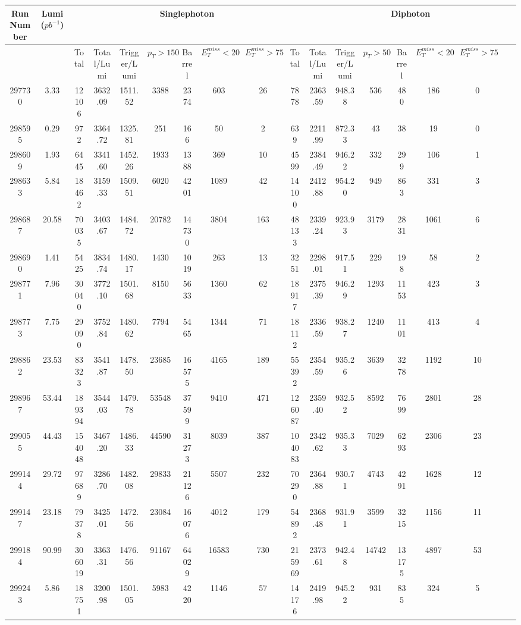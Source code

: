 \documentclass[10pt]{extarticle}
\begin{document}
\begin{longtable}{|c|c|c|c|c|c|c|c|c|c|c|c|c|c|c|c|c|c|}
\hline 
Run Number & Lumi ($pb^{-1}$) & \multicolumn{8}{|c|}{Singlephoton} & \multicolumn{8}{|c|}{Diphoton} \\ 
\hline 
 & & Total & Total/Lumi & Trigger/Lumi & $p_{T} > 150$ & Barrel & $E_{T}^{miss} < 20$ & $E_{T}^{miss} > 75$ & Total & Total/Lumi & Trigger/Lumi & $p_{T} > 50$ & Barrel & $E_{T}^{miss} < 20$ & $E_{T}^{miss} > 75$ \\ 
\hline 
297730&3.33&12106&3632.09&1511.52&3388&2374&603&26&7878&2363.59&948.38&536&480&186&0 \\ 
\hline 
298595&0.29&972&3364.72&1325.81&251&166&50&2&639&2211.99&872.33&43&38&19&0 \\ 
\hline 
298609&1.93&6445&3341.60&1452.26&1933&1388&369&10&4599&2384.49&946.22&332&299&106&1 \\ 
\hline 
298633&5.84&18462&3159.33&1509.51&6020&4201&1089&42&14100&2412.88&954.20&949&863&331&3 \\ 
\hline 
298687&20.58&70035&3403.67&1484.72&20782&14730&3804&163&48133&2339.24&923.93&3179&2831&1061&6 \\ 
\hline 
298690&1.41&5425&3834.74&1480.17&1430&1019&263&13&3251&2298.01&917.51&229&198&58&2 \\ 
\hline 
298771&7.96&30040&3772.10&1501.68&8150&5633&1360&62&18917&2375.39&946.29&1293&1153&423&3 \\ 
\hline 
298773&7.75&29090&3752.84&1480.62&7794&5465&1344&71&18112&2336.59&938.27&1240&1101&413&4 \\ 
\hline 
298862&23.53&83323&3541.87&1478.50&23685&16575&4165&189&55392&2354.59&935.26&3639&3278&1192&10 \\ 
\hline 
298967&53.44&189394&3544.03&1479.78&53548&37599&9410&471&126087&2359.40&932.52&8592&7699&2801&28 \\ 
\hline 
299055&44.43&154048&3467.20&1486.33&44590&31273&8039&387&104083&2342.62&935.33&7029&6293&2306&23 \\ 
\hline 
299144&29.72&97689&3286.70&1482.08&29833&21126&5507&232&70290&2364.88&930.71&4743&4291&1628&12 \\ 
\hline 
299147&23.18&79378&3425.01&1472.56&23084&16076&4012&179&54892&2368.48&931.91&3599&3215&1156&11 \\ 
\hline 
299184&90.99&306019&3363.31&1476.56&91167&64029&16583&730&215969&2373.61&942.48&14742&13175&4897&53 \\ 
\hline 
299243&5.86&18751&3200.98&1501.05&5983&4220&1146&57&14176&2419.98&945.22&931&835&324&5 \\ 

\end{longtable}
\end{document}
